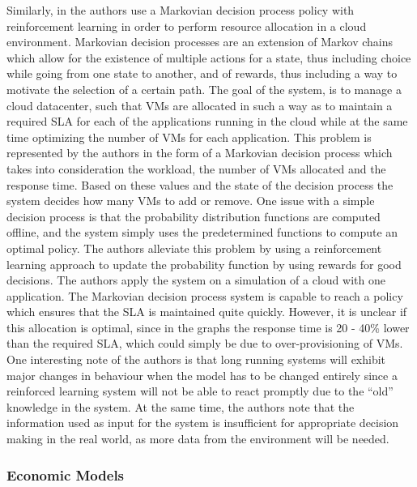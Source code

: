 Similarly, in \cite{related:markov2} the authors use a Markovian decision process policy with reinforcement learning in order to perform resource allocation in a cloud environment. Markovian decision processes are an extension of Markov chains which allow for the existence of multiple actions for a state, thus including choice while going from one state to another, and of rewards, thus including a way to motivate the selection of a certain path. The goal of the system, is to manage a cloud datacenter, such that VMs are allocated in such a way as to maintain a required SLA for each of the applications running in the cloud while at the same time optimizing the number of VMs for each application. This problem is represented by the authors in the form of a Markovian decision process which takes into consideration the workload, the number of VMs allocated and the response time. Based on these values and the state of the decision process the system decides how many VMs to add or remove. One issue with a simple decision process is that the probability distribution functions are computed offline, and the system simply uses the predetermined functions to compute an optimal policy. The authors alleviate this problem by using a reinforcement learning approach to update the probability function by using rewards for good decisions. The authors apply the system on a simulation of a cloud with one application. The Markovian decision process system is capable to reach a policy which ensures that the SLA is maintained quite quickly. However, it is unclear if this allocation is optimal, since in the graphs the response time is 20 - 40\% lower than the required SLA, which could simply be due to over-provisioning of VMs. One interesting note of the authors is that long running systems will exhibit major changes in behaviour when the model has to be changed entirely since a reinforced learning system will not be able to react promptly due to the ``old'' knowledge in the system. At the same time, the authors note that the information used as input for the system is insufficient for appropriate decision making in the real world, as more data from the environment will be needed.

\subsubsection{Economic Models}

